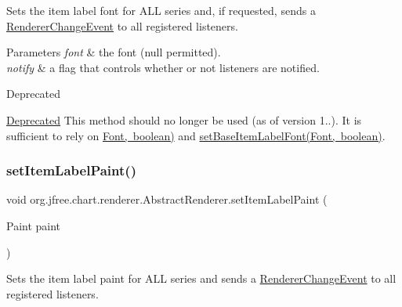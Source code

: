 Sets the item label font for A\+LL series and, if requested, sends a \mbox{\hyperlink{}{Renderer\+Change\+Event}} to all registered listeners.


\begin{DoxyParams}{Parameters}
{\em font} & the font ({\ttfamily null} permitted). \\
\hline
{\em notify} & a flag that controls whether or not listeners are notified.\\
\hline
\end{DoxyParams}
\begin{DoxyRefDesc}{Deprecated}
\item[\mbox{\hyperlink{deprecated__deprecated000133}{Deprecated}}]This method should no longer be used (as of version 1..). It is sufficient to rely on \mbox{\hyperlink{}{Font, boolean)}} and \mbox{\hyperlink{classorg_1_1jfree_1_1chart_1_1renderer_1_1_abstract_renderer_a4d629460f56707639561cf4296721553}{set\+Base\+Item\+Label\+Font(\+Font, boolean)}}. \end{DoxyRefDesc}
\mbox{\label{classorg_1_1jfree_1_1chart_1_1renderer_1_1_abstract_renderer_a03723d65857f761a3f36c0af8db9b2f4}} 
\subsubsection{\texorpdfstring{set\+Item\+Label\+Paint()}{setItemLabelPaint()}\hspace{0.1cm}{\footnotesize\ttfamily [1/2]}}
{\footnotesize\ttfamily void org.\+jfree.\+chart.\+renderer.\+Abstract\+Renderer.\+set\+Item\+Label\+Paint (\begin{DoxyParamCaption}\item[{Paint}]{paint }\end{DoxyParamCaption})}

Sets the item label paint for A\+LL series and sends a \mbox{\hyperlink{}{Renderer\+Change\+Event}} to all registered listeners.


